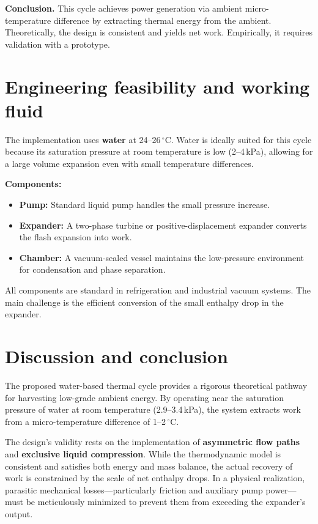 \documentclass[11pt,a4paper]{article}
\begin{document}
\textbf{Conclusion.} This cycle achieves power generation via ambient micro-temperature difference 
by extracting thermal energy from the ambient. Theoretically, the design is 
consistent and yields net work. Empirically, it requires validation with a 
prototype.

\section{Engineering feasibility and working fluid}
\label{sec:engineering_feasibility}

The implementation uses \textbf{water} at 24--26\,$^\circ$C. Water is 
ideally suited for this cycle because its saturation pressure at room 
temperature is low (2--4\,kPa), allowing for a large volume expansion even with 
small temperature differences.

\textbf{Components:}
\begin{itemize}
  \item \textbf{Pump:} Standard liquid pump handles the small pressure increase.
  \item \textbf{Expander:} A two-phase turbine or positive-displacement expander converts the flash expansion into work.
  \item \textbf{Chamber:} A vacuum-sealed vessel maintains the low-pressure environment for condensation and phase separation.
\end{itemize}

All components are standard in refrigeration and industrial vacuum systems. 
The main challenge is the efficient conversion of the small enthalpy drop 
in the expander.


\section{Discussion and conclusion}
\label{sec:conclusion}

The proposed water-based thermal cycle provides a rigorous theoretical 
pathway for harvesting low-grade ambient energy. By operating near 
the saturation pressure of water at room temperature (2.9--3.4\,kPa), 
the system extracts work from a micro-temperature difference of 
1--2\,$^\circ$C.

The design’s validity rests on the implementation of \textbf{asymmetric 
flow paths} and \textbf{exclusive liquid compression}. While the 
thermodynamic model is consistent and satisfies both energy and mass 
balance, the actual recovery of work is constrained by the scale of 
net enthalpy drops. In a physical realization, parasitic mechanical 
losses—particularly friction and auxiliary pump power—must be 
meticulously minimized to prevent them from exceeding the expander's 
output.
\end{document}
